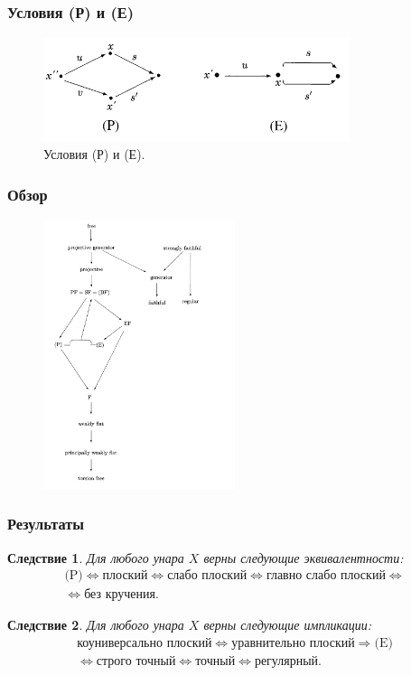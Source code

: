 \documentclass[11pt, notheorems]{beamer}
\newtheorem{corollary}{Следствие}
\begin{document}
\begin{frame}
	\frametitle{Условия (Р) и (Е)}

	\begin{figure}
		\center
		\includegraphics[width=0.8\textwidth]{p_and_e}
		\caption{Условия (Р) и (Е).}
	\end{figure}
\end{frame}

\begin{frame}
	\frametitle{Обзор}

	\begin{figure}
		\center
		\includegraphics[width=0.5\textwidth]{overview_1.png}
	\end{figure}
\end{frame}

\begin{frame}
	\frametitle{Результаты}

	\begin{corollary}
		Для любого унара $X$ верны следующие эквивалентности:
		\begin{multline*}
			\text{(P)} \Leftrightarrow \text{плоский} \Leftrightarrow \text{слабо плоский} \Leftrightarrow \text{главно слабо плоский} \Leftrightarrow \\
			\Leftrightarrow \text{без кручения}.
		\end{multline*}
	\end{corollary}

	\begin{corollary}
		Для любого унара $X$ верны следующие импликации:
		\begin{gather*}
			\text{коуниверсально плоский} \Leftrightarrow \text{уравнительно плоский} \Rightarrow \text{(E)} \\
			\Leftrightarrow \text{строго точный} \Leftrightarrow \text{точный} \Leftrightarrow \text{регулярный.}
		\end{gather*}
	\end{corollary}
\end{frame}
\end{document}
